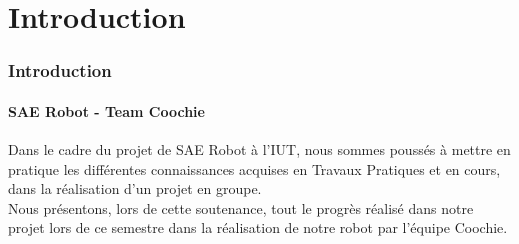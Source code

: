 \section{Introduction}

\begin{frame}
\frametitle{Introduction}
\framesubtitle{SAE Robot - Team Coochie}
Dans le cadre du projet de SAE Robot à l'IUT, nous sommes poussés à mettre en pratique
les différentes connaissances acquises en Travaux Pratiques et en cours, dans la réalisation d’un projet en groupe. \\
Nous présentons, lors de cette soutenance, tout le progrès réalisé dans notre projet
lors de ce semestre dans la réalisation de notre robot par l'équipe Coochie.
\end{frame}